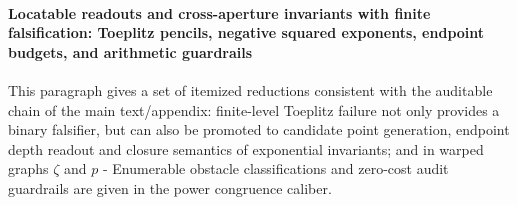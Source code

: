 %
%

\paragraph{Locatable readouts and cross-aperture invariants with finite falsification: Toeplitz pencils, negative squared exponents, endpoint budgets, and arithmetic guardrails}
This paragraph gives a set of itemized reductions consistent with the auditable chain of the main text/appendix: finite-level Toeplitz failure not only provides a binary falsifier, but can also be promoted to candidate point generation, endpoint depth readout and closure semantics of exponential invariants; and in warped graphs \(\zeta\) and \(p\) - Enumerable obstacle classifications and zero-cost audit guardrails are given in the power congruence caliber.

